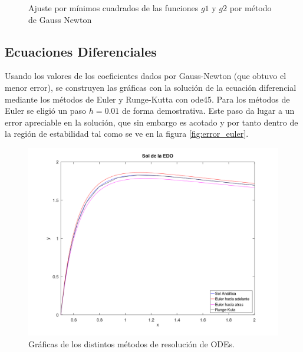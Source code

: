 \documentclass{endm}
\begin{document}
\begin{figure}%
    \centering
    \qquad
    \caption{Ajuste por mínimos cuadrados de las funciones $g1$ y $g2$ por método de Gauss Newton}%
    \label{fig:example}%
\end{figure}

\subsection{Ecuaciones Diferenciales}
Usando los valores de los coeficientes dados por Gauss-Newton (que obtuvo el menor error), se construyen las gráficas
con la solución de la ecuación diferencial mediante los métodos de Euler y Runge-Kutta con ode45.
Para los métodos de Euler se eligió un paso $h = 0.01$ de forma demostrativa. Este paso da lugar a un error apreciable en
la solución, que sin embargo es acotado y por tanto dentro de la región de estabilidad tal como se ve en la figura \ref{fig:error_euler}.
\begin{figure}
    \includegraphics[width=\linewidth]{ecdif.png}
    \caption{Gráficas de los distintos métodos de resolución de ODEs.}
    \label{fig:ecdif}
\end{figure}
\end{document}
